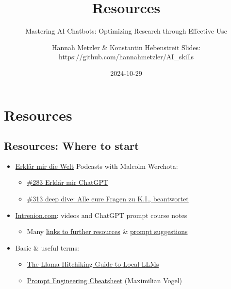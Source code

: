 \documentclass[
  letterpaper,
  DIV=11,
  numbers=noendperiod]{scrartcl}
\title{Resources}
\subtitle{Mastering AI Chatbots: Optimizing Research through Effective
Use}
\author{Hannah Metzler \& Konstantin Hebenstreit Slides:
https://github.com/hannahmetzler/AI\_skills}
\date{2024-10-29}
\providecommand{\tightlist}{%
  \setlength{\itemsep}{0pt}\setlength{\parskip}{0pt}}\usepackage{longtable,booktabs,array}
\renewcommand*\contentsname{Table of contents}
\newcommand\contentsname{Table of contents}
\begin{document}
\maketitle

\renewcommand*\contentsname{Table of contents}
{
\hypersetup{linkcolor=}
\setcounter{tocdepth}{3}
\tableofcontents
}

\section{Resources}\label{resources}

\subsection{Resources: Where to start}\label{resources-where-to-start}

\begin{itemize}
\tightlist
\item
  \href{https://xn--erklrmir-3za.at/}{Erklär mir die Welt} Podcasts with
  Malcolm Werchota:

  \begin{itemize}
  \tightlist
  \item
    \href{https://xn--erklrmir-3za.at/2023/12/27/283-erklaer-mir-chatgpt-malcolm-werchota/}{\#283
    Erklär mir ChatGPT}
  \item
    \href{https://xn--erklrmir-3za.at/2024/07/30/deep-dive-alle-eure-fragen-zu-k-i-beantwortet/}{\#313
    deep dive: Alle eure Fragen zu K.I., beantwortet}
  \end{itemize}
\item
  \href{https://intrenion.com}{Intrenion.com}: videos and ChatGPT prompt
  course notes

  \begin{itemize}
  \tightlist
  \item
    Many
    \href{https://www.intrenion.com/Generative-AI-Research-Policies-EN-DE-23a4800b10c34ed3a637646ba73b68e8}{links
    to further resources} \&
    \href{https://www.intrenion.com/12ae2c1dbf7980dfbc60ea5513649ea1?v=e29263bc65bd4b71af467eb91955bdde}{prompt
    suggestions}
  \end{itemize}
\item
  Basic \& useful terms:

  \begin{itemize}
  \tightlist
  \item
    \href{https://osanseviero.github.io/hackerllama/blog/posts/hitchhiker_guide/}{The
    Llama Hitchiking Guide to Local LLMs}
  \item
    \href{https://big-picture.com/media/the_prompt_engineering_cheat_sheet.pdf}{Prompt
    Engineering Cheatsheet} (Maximilian Vogel)
  \end{itemize}
\end{itemize}
\end{document}

